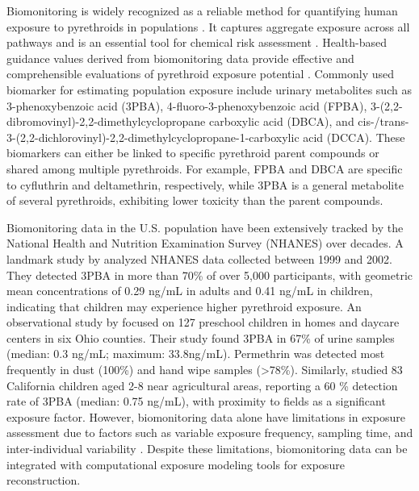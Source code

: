 \documentclass[toxics,article,submit,pdftex,moreauthors]{Definitions/mdpi}
\begin{document}
Biomonitoring is widely recognized as a reliable method for quantifying
human exposure to pyrethroids in populations
\citep{barr2010urinary, quindroit2021estimating, tarazona2022tiered}. It
captures aggregate exposure across all pathways and is an essential tool
for chemical risk assessment
\citep{blount2007perchlorate, sobus2015uses}. Health-based guidance
values derived from biomonitoring data provide effective and
comprehensible evaluations of pyrethroid exposure potential
\citep{apel2023human}. Commonly used biomarker for estimating population
exposure include urinary metabolites such as 3-phenoxybenzoic acid
(3PBA), 4-fluoro-3-phenoxybenzoic acid (FPBA),
3-(2,2-dibromovinyl)-2,2-dimethylcyclopropane carboxylic acid (DBCA),
and
cis-/trans-3-(2,2-dichlorovinyl)-2,2-dimethylcyclopropane-1-carboxylic
acid (DCCA). These biomarkers can either be linked to specific
pyrethroid parent compounds or shared among multiple pyrethroids. For
example, FPBA and DBCA are specific to cyfluthrin and deltamethrin,
respectively, while 3PBA is a general metabolite of several pyrethroids,
exhibiting lower toxicity than the parent compounds.

Biomonitoring data in the U.S. population have been extensively tracked by the
National Health and Nutrition Examination Survey (NHANES) over decades. A
landmark study by \citet{barr2010urinary} analyzed NHANES data collected
between 1999 and 2002. They detected 3PBA in more than 70\% of over 5,000
participants, with geometric mean concentrations of 0.29 ng/mL in adults and
0.41 ng/mL in children, indicating that children may experience higher
pyrethroid exposure. An observational study by \citet{morgan2007observational}
focused on 127 preschool children in homes and daycare centers in six Ohio
counties. Their study found 3PBA in 67\% of urine samples (median: 0.3 ng/mL;
maximum: 33.8ng/mL). Permethrin was detected most frequently in dust (100\%) and
hand wipe samples (>78\%). Similarly, \citet{trunnelle2014urinary} studied 83
California children aged 2-8 near agricultural areas, reporting a 60 \%
detection rate of 3PBA (median: 0.75 ng/mL), with proximity to fields as a
significant exposure factor. However, biomonitoring data alone have limitations
in exposure assessment due to factors such as variable exposure frequency,
sampling time, and inter-individual variability \citep{aylward2017variation}.
Despite these limitations, biomonitoring data can be integrated with
computational exposure modeling tools for exposure reconstruction.
\end{document}
